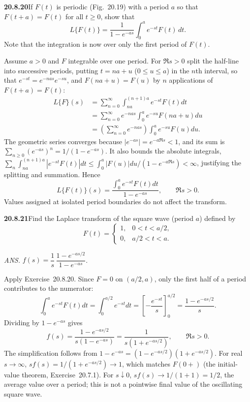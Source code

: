 \par\bigskip
\noindent\textbf{20.8.20}\quad If $F(t)$ is periodic
(Fig.~20.19) with a period $a$ so that $F(t+a)=F(t)$ for all
$t\ge0$, show that
\[
L\{F(t)\}=\frac{1}{1-e^{-as}}\int_{0}^{a}e^{-st}F(t)\,dt.
\]
Note that the integration is now over only the first period of
$F(t)$.
\par{}
\solution
Assume $a>0$ and $F$ integrable over one period.
For $\Re s>0$ split the half-line into successive periods,
putting $t=na+u$ ($0\le u\le a$) in the $n$th interval, so that
$e^{-st}=e^{-nas}e^{-su}$, and $F(na+u)=F(u)$ by $n$
applications of $F(t+a)=F(t)$:
\begin{align*}
L\{F\}(s)
&=\sum_{n=0}^\infty\int_{na}^{(n+1)a}e^{-st}F(t)dt\\
&=\sum_{n=0}^\infty e^{-nas}
\int_0^a e^{-su}F(na+u)du\\
&=\left(\sum_{n=0}^\infty e^{-nas}\right)
\int_0^a e^{-su}F(u)du.
\end{align*}
The geometric series converges because
$|e^{-as}|=e^{-a\Re s}<1$, and its sum is
$\sum_{n\ge0}(e^{-as})^n=1/(1-e^{-as})$.
It also bounds the absolute integrals,
$\sum_n\int_{na}^{(n+1)a}|e^{-st}F(t)|dt
\le\int_0^a|F(u)|du/(1-e^{-a\Re s})<\infty$, justifying the
splitting and summation. Hence
\[
\boxed{L\{F(t)\}(s)=\frac{\displaystyle\int_0^a e^{-st}F(t)dt}
{1-e^{-as}}},\qquad\Re s>0.
\]
Values assigned at isolated period boundaries do not affect
the transform.

\par\bigskip
\noindent\textbf{20.8.21}\quad Find the Laplace transform of the
square wave (period $a$) defined by
\[
F(t)=\begin{cases}
1, & 0<t<a/2,\\
0, & a/2<t<a.
\end{cases}
\]
\par\nobreak\hfill\emph{ANS.}\enspace
$f(s)=\dfrac{1}{s}\,\dfrac{1-e^{-as/2}}{1-e^{-as}}$.
\par{}
\solution
Apply Exercise~20.8.20. Since $F=0$ on $(a/2,a)$, only the
first half of a period contributes to the numerator:
\[
\int_0^a e^{-st}F(t)dt
=\int_0^{a/2}e^{-st}dt=\left[-\frac{e^{-st}}s\right]_0^{a/2}
=\frac{1-e^{-as/2}}s.
\]
Dividing by $1-e^{-as}$ gives
\[
\boxed{f(s)=\frac{1-e^{-as/2}}{s(1-e^{-as})}
=\frac1{s(1+e^{-as/2})}},\qquad\Re s>0.
\]
The simplification follows from
$1-e^{-as}=(1-e^{-as/2})(1+e^{-as/2})$.
For real $s\to\infty$, $sf(s)=1/(1+e^{-as/2})\to1$, which
matches $F(0+)$ (the initial-value theorem,
Exercise~20.7.1).
For $s\downarrow0$, $sf(s)\to1/(1+1)=1/2$, the average value
over a period; this is not a pointwise final value of the
oscillating square wave.

